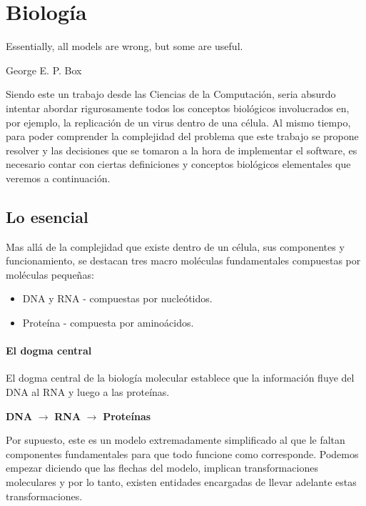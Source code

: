 \chapter{Biolog\'ia}
\label{biologia}
\epigraph{Essentially, all models are wrong, but some are useful.}%
{George E. P. Box}

Siendo este un trabajo desde las Ciencias de la Computaci\'on, seria absurdo
intentar abordar rigurosamente todos los conceptos biol\'ogicos involucrados
en, por ejemplo, la replicaci\'on de un virus dentro de una c\'elula. Al mismo
tiempo, para poder comprender la complejidad del problema que este trabajo se
propone resolver y las decisiones que se tomaron a la hora de implementar el
software, es necesario contar con ciertas definiciones y conceptos biol\'ogicos
elementales que veremos a continuaci\'on.

\section{Lo esencial}
\label{bio-esencial}

Mas all\'a de la complejidad que existe dentro de un c\'elula, sus componentes
y funcionamiento, se destacan tres macro mol\'eculas fundamentales compuestas
por mol\'eculas peque\~nas:
\begin{itemize}
 \item \ac{DNA} y \ac{RNA} - compuestas por nucle\'otidos. 
 \item Prote\'ina - compuesta por amino\'acidos.
\end{itemize}

\subsubsection{El dogma central}

El dogma central de la biolog\'ia molecular establece que la informaci\'on
fluye del \ac{DNA} al \ac{RNA} y luego a las prote\'inas.
\begin{center}
 \textbf{DNA} $\longrightarrow$ \textbf{RNA} $\longrightarrow$
\textbf{Prote\'inas}
\end{center}

Por supuesto, este es un modelo extremadamente simplificado al que le faltan
componentes fundamentales para que todo funcione como corresponde. Podemos
empezar diciendo que las flechas del modelo, implican transformaciones
moleculares y por lo tanto, existen entidades encargadas de llevar adelante
estas transformaciones. 

